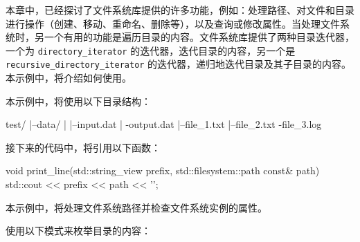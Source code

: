

本章中，已经探讨了文件系统库提供的许多功能，例如：处理路径、对文件和目录进行操作（创建、移动、重命名、删除等），以及查询或修改属性。当处理文件系统时，另一个有用的功能是遍历目录的内容。文件系统库提供了两种目录迭代器，一个为 \verb|directory_iterator| 的迭代器，迭代目录的内容，另一个是 \verb|recursive_directory_iterator| 的迭代器，递归地迭代目录及其子目录的内容。本示例中，将介绍如何使用。


本示例中，将使用以下目录结构：

\begin{shell}
test/
|--data/
|   |--input.dat
|   \--output.dat
|--file_1.txt
|--file_2.txt
\--file_3.log
\end{shell}

接下来的代码中，将引用以下函数：

\begin{cpp}
void print_line(std::string_view prefix,
std::filesystem::path const& path)
{
    std::cout << prefix << path << '\n';
}
\end{cpp}

本示例中，将处理文件系统路径并检查文件系统实例的属性。


使用以下模式来枚举目录的内容：

